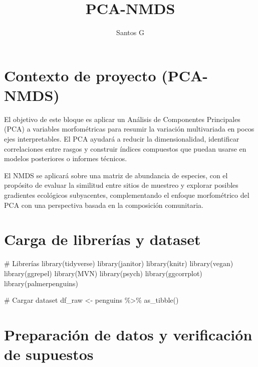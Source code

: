 \documentclass[
  spanish,
  11pt,
  a4paper,
  DIV=11,
  numbers=noendperiod]{scrartcl}
\title{PCA-NMDS}
\author{Santos G}
\date{}
\newenvironment{Shaded}{\begin{snugshade}}{\end{snugshade}}
\newcommand{\CommentTok}[1]{\textcolor[rgb]{0.37,0.37,0.37}{#1}}
\newcommand{\FunctionTok}[1]{\textcolor[rgb]{0.28,0.35,0.67}{#1}}
\newcommand{\NormalTok}[1]{\textcolor[rgb]{0.00,0.23,0.31}{#1}}
\newcommand{\OtherTok}[1]{\textcolor[rgb]{0.00,0.23,0.31}{#1}}
\newcommand{\SpecialCharTok}[1]{\textcolor[rgb]{0.37,0.37,0.37}{#1}}
\renewcommand*\contentsname{Tabla de contenidos}
\newcommand\contentsname{Tabla de contenidos}
\begin{document}
\maketitle

\renewcommand*\contentsname{Tabla de contenidos}
{
\hypersetup{linkcolor=}
\setcounter{tocdepth}{2}
\tableofcontents
}

\section{Contexto de proyecto
(PCA-NMDS)}\label{contexto-de-proyecto-pca-nmds}

El objetivo de este bloque es aplicar un Análisis de Componentes
Principales (PCA) a variables morfométricas para resumir la variación
multivariada en pocos ejes interpretables. El PCA ayudará a reducir la
dimensionalidad, identificar correlaciones entre rasgos y construir
índices compuestos que puedan usarse en modelos posteriores o informes
técnicos.

El NMDS se aplicará sobre una matriz de abundancia de especies, con el
propósito de evaluar la similitud entre sitios de muestreo y explorar
posibles gradientes ecológicos subyacentes, complementando el enfoque
morfométrico del PCA con una perspectiva basada en la composición
comunitaria.

\section{Carga de librerías y
dataset}\label{carga-de-libreruxedas-y-dataset}

\begin{Shaded}
\begin{Highlighting}[numbers=left,,]
\CommentTok{\# Librerías}
\FunctionTok{library}\NormalTok{(tidyverse)}
\FunctionTok{library}\NormalTok{(janitor)}
\FunctionTok{library}\NormalTok{(knitr)}
\FunctionTok{library}\NormalTok{(vegan)}
\FunctionTok{library}\NormalTok{(ggrepel) }
\FunctionTok{library}\NormalTok{(MVN)}
\FunctionTok{library}\NormalTok{(psych)}
\FunctionTok{library}\NormalTok{(ggcorrplot)}
\FunctionTok{library}\NormalTok{(palmerpenguins) }

\CommentTok{\# Cargar dataset}
\NormalTok{df\_raw }\OtherTok{\textless{}{-}}\NormalTok{ penguins }\SpecialCharTok{\%\textgreater{}\%} \FunctionTok{as\_tibble}\NormalTok{()}
\end{Highlighting}
\end{Shaded}

\section{Preparación de datos y verificación de
supuestos}\label{preparaciuxf3n-de-datos-y-verificaciuxf3n-de-supuestos}
\end{document}
